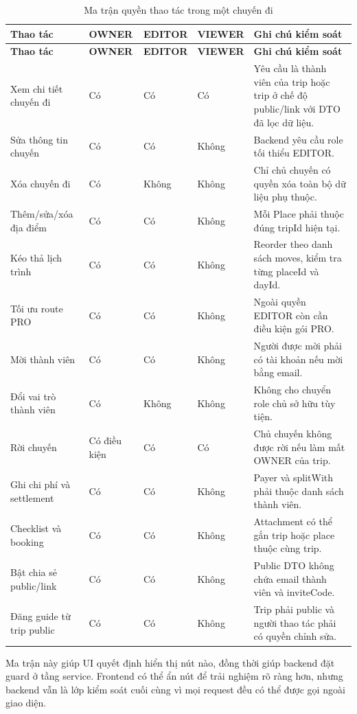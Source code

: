 \documentclass[a4paper]{report}
\begin{document}
\begin{longtable}{|P{4.2cm}|C{1.45cm}|C{1.45cm}|C{1.45cm}|P{6.2cm}|}
\caption{Ma trận quyền thao tác trong một chuyến đi}\\
\hline
\textbf{Thao tác} & \textbf{OWNER} & \textbf{EDITOR} & \textbf{VIEWER} & \textbf{Ghi chú kiểm soát}\\
\hline
\endfirsthead
\hline
\textbf{Thao tác} & \textbf{OWNER} & \textbf{EDITOR} & \textbf{VIEWER} & \textbf{Ghi chú kiểm soát}\\
\hline
\endhead
Xem chi tiết chuyến đi & Có & Có & Có & Yêu cầu là thành viên của trip hoặc trip ở chế độ public/link với DTO đã lọc dữ liệu.\\
\hline
Sửa thông tin chuyến & Có & Có & Không & Backend yêu cầu role tối thiểu EDITOR.\\
\hline
Xóa chuyến đi & Có & Không & Không & Chỉ chủ chuyến có quyền xóa toàn bộ dữ liệu phụ thuộc.\\
\hline
Thêm/sửa/xóa địa điểm & Có & Có & Không & Mỗi Place phải thuộc đúng tripId hiện tại.\\
\hline
Kéo thả lịch trình & Có & Có & Không & Reorder theo danh sách moves, kiểm tra từng placeId và dayId.\\
\hline
Tối ưu route PRO & Có & Có & Không & Ngoài quyền EDITOR còn cần điều kiện gói PRO.\\
\hline
Mời thành viên & Có & Có & Không & Người được mời phải có tài khoản nếu mời bằng email.\\
\hline
Đổi vai trò thành viên & Có & Không & Không & Không cho chuyển role chủ sở hữu tùy tiện.\\
\hline
Rời chuyến & Có điều kiện & Có & Có & Chủ chuyến không được rời nếu làm mất OWNER của trip.\\
\hline
Ghi chi phí và settlement & Có & Có & Không & Payer và splitWith phải thuộc danh sách thành viên.\\
\hline
Checklist và booking & Có & Có & Không & Attachment có thể gắn trip hoặc place thuộc cùng trip.\\
\hline
Bật chia sẻ public/link & Có & Có & Không & Public DTO không chứa email thành viên và inviteCode.\\
\hline
Đăng guide từ trip public & Có & Có & Không & Trip phải public và người thao tác phải có quyền chỉnh sửa.\\
\hline
\end{longtable}

Ma trận này giúp UI quyết định hiển thị nút nào, đồng thời giúp backend đặt guard ở tầng service. Frontend có thể ẩn nút để trải nghiệm rõ ràng hơn, nhưng backend vẫn là lớp kiểm soát cuối cùng vì mọi request đều có thể được gọi ngoài giao diện.
\end{document}
